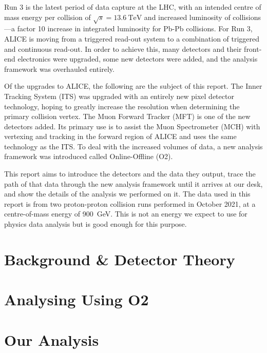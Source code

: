 \documentclass[11pt]{article}
\numberwithin{equation}{section}
\numberwithin{figure}{section}
\numberwithin{table}{section}
\begin{document}
Run 3 is the latest period of data capture at the LHC, with an intended centre of mass energy per collision of $\sqrt{s}=\SI{13.6}{\tera\electronvolt}$ and increased luminosity of collisions---a factor 10 increase in integrated luminosity for Pb-Pb collisions. For Run 3, ALICE is moving from a triggered read-out system to a combination of triggered and continuous read-out. In order to achieve this, many detectors and their front-end electronics were upgraded, some new detectors were added, and the analysis framework was overhauled entirely. 

Of the upgrades to ALICE, the following are the subject of this report. The Inner Tracking System (ITS) was upgraded with an entirely new pixel detector technology, hoping to greatly increase the resolution when determining the primary collision vertex. The Muon Forward Tracker (MFT) is one of the new detectors added. Its primary use is to assist the Muon Spectrometer (MCH) with vertexing and tracking in the forward region of ALICE and uses the same technology as the ITS. To deal with the increased volumes of data, a new analysis framework was introduced called Online-Offline (O2). 

This report aims to introduce the detectors and the data they output, trace the path of that data through the new analysis framework until it arrives at our desk, and show the details of the analysis we performed on it. The data used in this report is from two proton-proton collision runs performed in October 2021, at a centre-of-mass energy of \SI{900}{\giga\electronvolt}. This is not an energy we expect to use for physics data analysis but is good enough for this purpose.

\section{Background \& Detector Theory}\label{sec:Background_Detector}


\section{Analysing Using O2}\label{sec:AnalysingWithO2}


\section{Our Analysis}\label{sec:OurAnalysis}

\end{document}
